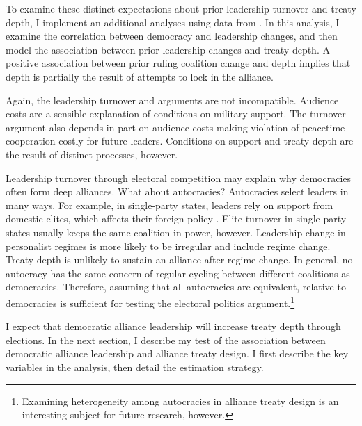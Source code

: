 \documentclass[12pt]{article}
\begin{document}
To examine these distinct expectations about prior leadership turnover and treaty depth, I implement an additional analyses using data from \citet{Mattesetal2016}. 
In this analysis, I examine the correlation between democracy and leadership changes, and then model the association between prior leadership changes and treaty depth. 
A positive association between prior ruling coalition change and depth implies that depth is partially the result of attempts to lock in the alliance. 




Again, the leadership turnover and arguments are not incompatible. 
Audience costs are a sensible explanation of conditions on military support.
The turnover argument also depends in part on audience costs making violation of peacetime cooperation costly for future leaders. 
Conditions on support and treaty depth are the result of distinct processes, however.


Leadership turnover through electoral competition may explain why democracies often form deep alliances. 
What about autocracies? 
Autocracies select leaders in many ways. 
For example, in single-party states, leaders rely on support from domestic elites, which affects their foreign policy \citep{Weeks2014}.
Elite turnover in single party states usually keeps the same coalition in power, however.  
Leadership change in personalist regimes is more likely to be irregular and include regime change.
Treaty depth is unlikely to sustain an alliance after regime change.  
In general, no autocracy has the same concern of regular cycling between different coalitions as democracies.
Therefore, assuming that all autocracies are equivalent, relative to democracies is sufficient for testing the electoral politics argument.\footnote{Examining heterogeneity among autocracies in alliance treaty design is an interesting subject for future research, however.} 


I expect that democratic alliance leadership will increase treaty depth through elections. 
In the next section, I describe my test of the association between democratic alliance leadership and alliance treaty design. 
I first describe the key variables in the analysis, then detail the estimation strategy.
\end{document}
